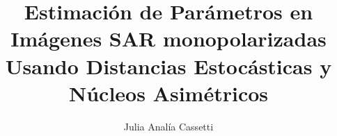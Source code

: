 \documentclass[oneside,numbers,nobibtoc]{ezthesis}
\author{Julia Analía Cassetti}
\title{Estimación de Parámetros en Imágenes SAR monopolarizadas Usando Distancias Estocásticas y Núcleos Asimétricos}
\theoremstyle{definition}
\numberwithin{equation}{section}
\begin{document}









\renewcommand{\tablename}{Tabla} 
\renewcommand{\listtablename}{Indice de tablas}
\tableofcontents
\listoffigures
\listoftables









\appendix
%
%
%


\end{document}
